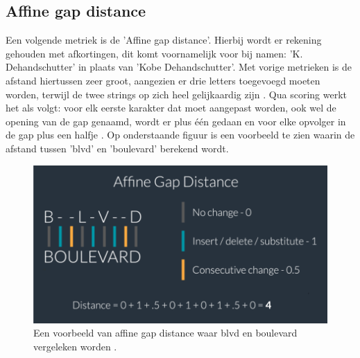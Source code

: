\subsection{Affine gap distance}
Een volgende metriek is de 'Affine gap distance'. Hierbij wordt er rekening gehouden met afkortingen, dit komt voornamelijk voor bij namen: 'K. Dehandschutter' in plaats van 'Kobe Dehandschutter'. Met vorige metrieken is de afstand hiertussen zeer groot, aangezien er drie letters toegevoegd moeten worden, terwijl de twee strings op zich heel gelijkaardig zijn \autocite{Walgran2019}. Qua scoring werkt het als volgt: voor elk eerste karakter dat moet aangepast worden, ook wel de opening van de gap genaamd, wordt er plus één gedaan en voor elke opvolger in de gap plus een halfje \autocite{Lievens2022}. Op onderstaande figuur is een voorbeeld te zien waarin de afstand tussen 'blvd' en 'boulevard' berekend wordt.
\\\indent
\begin{figure}[h]
    \centering
    \includegraphics[width=0.7\linewidth]{../foto's/affine-gap}
    \caption{Een voorbeeld van affine gap distance waar blvd en boulevard vergeleken worden \autocite{Azavea2019}.}
    \label{fig:affine-gap}
\end{figure}


